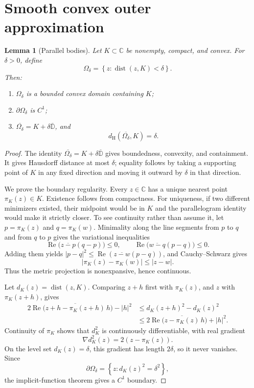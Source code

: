 \documentclass[11pt,oneside,openany]{book}
\newtheorem{lemma}[theorem]{Lemma}
\theoremstyle{definition}
\theoremstyle{remark}
\newcommand{\C}{\mathbb C}
\newcommand{\D}{\mathbb D}
\newcommand{\dist}{\operatorname{dist}}
\newcommand{\RePart}{\operatorname{Re}}
\newcommand{\set}[1]{\left\{#1\right\}}
\newcommand{\olD}{\overline{\D}}
\begin{document}
\section{Smooth convex outer approximation}

\begin{lemma}[Parallel bodies]
\label{lem:outer-approximation}
Let \(K\subset\C\) be nonempty, compact, and convex.  For
\(\delta>0\), define
\[
  \Omega_\delta=\set{z:\dist(z,K)<\delta}.
\]
Then:
\begin{enumerate}
  \item \(\Omega_\delta\) is a bounded convex domain containing \(K\);
  \item \(\partial\Omega_\delta\) is \(C^1\);
  \item \(\overline{\Omega_\delta}=K+\delta\olD\), and
  \[
    d_{\mathrm H}(\overline{\Omega_\delta},K)=\delta.
  \]
\end{enumerate}
\end{lemma}

\begin{proof}
The identity
\(\overline{\Omega_\delta}=K+\delta\olD\) gives boundedness,
convexity, and containment.  It gives Hausdorff distance at most
\(\delta\); equality follows by taking a supporting point of \(K\) in
any fixed direction and moving it outward by \(\delta\) in that
direction.

We prove the boundary regularity.  Every \(z\in\C\) has a unique
nearest point \(\pi_K(z)\in K\).  Existence follows from compactness.
For uniqueness, if two different minimizers existed, their midpoint
would be in \(K\) and the parallelogram identity would make it strictly
closer.  To see continuity rather than assume it, let
\(p=\pi_K(z)\) and \(q=\pi_K(w)\).  Minimality along the line segments
from \(p\) to \(q\) and from \(q\) to \(p\) gives the variational
inequalities
\[
  \RePart\bigl(\overline{z-p}(q-p)\bigr)\leq0,
  \qquad
  \RePart\bigl(\overline{w-q}(p-q)\bigr)\leq0.
\]
Adding them yields
\(
|p-q|^2\leq\RePart(\overline{z-w}(p-q))
\),
and Cauchy--Schwarz gives
\[
  |\pi_K(z)-\pi_K(w)|\leq|z-w|.
\]
Thus the metric projection is nonexpansive, hence continuous.

Let \(d_K(z)=\dist(z,K)\).  Comparing \(z+h\) first with
\(\pi_K(z)\), and \(z\) with \(\pi_K(z+h)\), gives
\begin{align*}
2\RePart\bigl(
  \overline{z+h-\pi_K(z+h)}\,h
\bigr)-|h|^2
&\leq d_K(z+h)^2-d_K(z)^2\\
&\leq
2\RePart\bigl(
  \overline{z-\pi_K(z)}\,h
\bigr)+|h|^2.
\end{align*}
Continuity of \(\pi_K\) shows that \(d_K^2\) is continuously
differentiable, with real gradient
\begin{equation}
  \nabla d_K^2(z)=2(z-\pi_K(z)).
  \label{eq:distance-gradient}
\end{equation}
On the level set \(d_K(z)=\delta\), this gradient has length
\(2\delta\), so it never vanishes.  Since
\[
  \partial\Omega_\delta
  =\set{z:d_K(z)^2=\delta^2},
\]
the implicit-function theorem gives a \(C^1\) boundary.
\end{proof}
\end{document}
